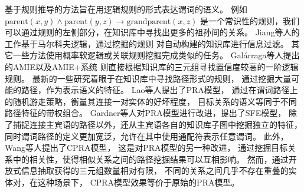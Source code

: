 
基于规则推导的方法旨在用逻辑规则的形式表达谓词的语义。
例如$\text{parent}(x, y) \land \text{parent}(y, z) \rightarrow \text{grandparent}(x, z)$
是一个常识性的规则，我们可以通过规则的左侧部分，在知识库中寻找出更多的祖孙间的关系。
Jiang等人的工作\parencite{jiang2012learning}基于马尔科夫逻辑，通过挖掘的规则
对自动构建的知识库进行信息过滤。
其它一些方法使用概率软逻辑或关联规则挖掘完成类似的任务\cite{pujara2013large,volker2011statistical}。
Gal\'arraga等人提出的AMIE\cite{galarraga2013amie}以及AMIE+\cite{galarraga2015fast}系统
则直接根据知识库的三元组寻找置信度较高的一阶逻辑规则。
最新的一些研究着眼于在知识库中寻找路径形式的规则，%
通过挖掘大量可能的路径，作为表示语义的特征。
Lao等人提出了PRA模型\cite{lao2011random}，
通过在谓词路径上的随机游走策略，衡量其连接一对实体的好坏程度，
目标关系的语义等同于不同路径特征的带权组合。
Gardner等人对PRA模型进行改进，提出了SFE模型\cite{gardner2015efficient}，
除了捕捉连接主宾语的路径以外，还从主宾语各自的知识库子图中挖掘独立的特征，
同时谓词路径的定义更加宽泛，允许在其中使用通配符表示任意谓词。
此外，Wang等人提出了CPRA模型\cite{wang2016knowledge}，
这是对PRA模型的另一种改进，
通过挖掘目标关系中的相关性，使得相似关系之间的路径挖掘结果可以互相影响。
然而，通过开放式信息抽取获得的三元组数量相对有限，
不同的关系之间几乎不存在重叠的实体对，在这种场景下，
CPRA模型效果等价于原始的PRA模型。

